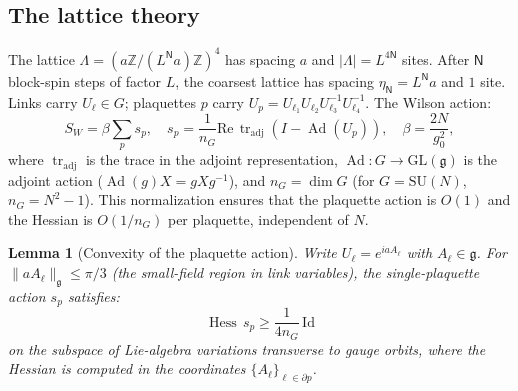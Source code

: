 \documentclass[11pt,a4paper]{article}
\theoremstyle{plain}
\newtheorem{lemma}[theorem]{Lemma}
\theoremstyle{definition}
\theoremstyle{remark}
\newcommand{\Z}{\mathbb{Z}}
\newcommand{\tr}{\operatorname{tr}}
\newcommand{\Ad}{\operatorname{Ad}}
\newcommand{\Hess}{\operatorname{Hess}}
\newcommand{\SU}{\mathrm{SU}}
\newcommand{\fg}{\mathfrak{g}}
\begin{document}
\subsection{The lattice theory}

The lattice $\Lambda = (a\Z/(L^{\mathsf{N}} a)\Z)^4$ has spacing $a$
and $|\Lambda| = L^{4\mathsf{N}}$ sites. After $\mathsf{N}$ block-spin steps
of factor $L$, the coarsest lattice has spacing $\eta_{\mathsf{N}} = L^{\mathsf{N}} a$
and $1$ site. Links carry
$U_\ell \in G$; plaquettes $p$ carry
$U_p = U_{\ell_1}U_{\ell_2}U_{\ell_3}^{-1}U_{\ell_4}^{-1}$.
The Wilson action:
\begin{equation}\label{eq:wilson}
  S_W = \beta\sum_p s_p, \quad
  s_p = \frac{1}{n_G}\mathrm{Re}\,\tr_{\mathrm{adj}}(I - \Ad(U_p)),
  \quad \beta = \frac{2N}{g_0^2},
\end{equation}
where $\tr_{\mathrm{adj}}$ is the trace in the adjoint
representation, $\Ad : G \to \mathrm{GL}(\fg)$ is the
adjoint action ($\Ad(g)X = gXg^{-1}$),
and $n_G = \dim G$ (for $G = \SU(N)$,
$n_G = N^2 - 1$). This normalization ensures that the
plaquette action is $O(1)$ and the Hessian is $O(1/n_G)$
per plaquette, independent of $N$.

\begin{lemma}[Convexity of the plaquette action]
\label{lem:convexity}
Write $U_\ell = e^{i a A_\ell}$ with $A_\ell \in \fg$.
For $\|aA_\ell\|_\fg \le \pi/3$ (the small-field region
in link variables), the single-plaquette action $s_p$
satisfies:
\begin{equation}\label{eq:plaq_hess}
  \Hess\,s_p \ge \frac{1}{4n_G}\,\mathrm{Id}
\end{equation}
on the subspace of Lie-algebra variations transverse to
gauge orbits, where the Hessian is computed in the
coordinates $\{A_\ell\}_{\ell \in \partial p}$.
\end{lemma}
\end{document}
